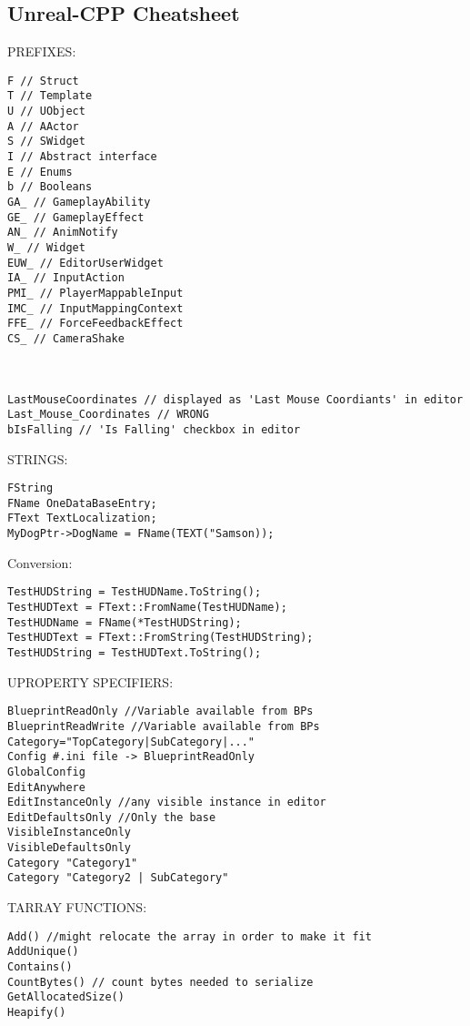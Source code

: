 \begin{landscape}
    \chapter{Unreal-CPP Cheatsheet}
    \begin{tcolorbox}[title=Basics, colframe=violet!95, colback=violet!45, center title]
        \begin{multicols}{2}
            PREFIXES:
            \begin{lstlisting}
F // Struct
T // Template
U // UObject
A // AActor
S // SWidget
I // Abstract interface
E // Enums
b // Booleans
GA_ // GameplayAbility
GE_ // GameplayEffect
AN_ // AnimNotify
W_ // Widget
EUW_ // EditorUserWidget
IA_ // InputAction
PMI_ // PlayerMappableInput
IMC_ // InputMappingContext
FFE_ // ForceFeedbackEffect
CS_ // CameraShake



LastMouseCoordinates // displayed as 'Last Mouse Coordiants' in editor
Last_Mouse_Coordinates // WRONG
bIsFalling // 'Is Falling' checkbox in editor
            \end{lstlisting}

            STRINGS:
            \begin{lstlisting}
FString
FName OneDataBaseEntry;
FText TextLocalization;
MyDogPtr->DogName = FName(TEXT("Samson));
            \end{lstlisting}
            
            Conversion:
            \begin{lstlisting}
TestHUDString = TestHUDName.ToString();
TestHUDText = FText::FromName(TestHUDName);
TestHUDName = FName(*TestHUDString);
TestHUDText = FText::FromString(TestHUDString);
TestHUDString = TestHUDText.ToString();
            \end{lstlisting}

            UPROPERTY SPECIFIERS:
            \begin{lstlisting}
BlueprintReadOnly //Variable available from BPs
BlueprintReadWrite //Variable available from BPs
Category="TopCategory|SubCategory|..."
Config #.ini file -> BlueprintReadOnly
GlobalConfig
EditAnywhere
EditInstanceOnly //any visible instance in editor
EditDefaultsOnly //Only the base
VisibleInstanceOnly
VisibleDefaultsOnly
Category "Category1"
Category "Category2 | SubCategory"
            \end{lstlisting}
            TARRAY FUNCTIONS:
            \begin{lstlisting}
Add() //might relocate the array in order to make it fit
AddUnique() 
Contains()
CountBytes() // count bytes needed to serialize
GetAllocatedSize()
Heapify()

            \end{lstlisting}    


        \end{multicols}
        \end{tcolorbox}
\end{landscape}

